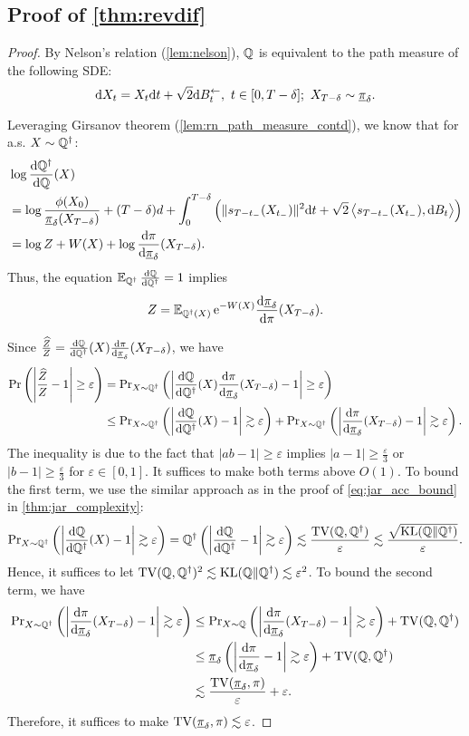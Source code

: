\subsection{Proof of \cref{thm:revdif}}
\label{app:prf:revdif}
\begin{proof}
By Nelson's relation (\cref{lem:nelson}), $\Q$ is equivalent to the path measure of the following SDE: 
$$\d X_t=X_t\d t+\sqrt{2}\d\Bl_t,~t\in[0,T-\delta];~X_{T-\delta}\sim\piu_\delta.$$

Leveraging Girsanov theorem (\cref{lem:rn_path_measure_contd}), we know that for a.s. $X\sim\Qd$:
\begin{align*}
    &\log\de{\Qd}{\Q}(X)\\
    &=\log\frac{\phi(X_0)}{\piu_\delta(X_{T-\delta})}+(T-\delta)d+\int_0^{T-\delta}\ro{\|s_{T-t_-}(X_{t_-})\|^2\d t+\sqrt{2}\inn{s_{T-t_-}(X_{t_-}),\d B_t}}\\
    &=\log Z+W(X)+\log\de{\pi}{\piu_\delta}(X_{T-\delta}).
\end{align*}
Thus, the equation $\E_{\Qd}\de{\Q}{\Qd}=1$ implies 
$$Z=\E_{\Qd(X)}\e^{-W(X)}\de{\piu_\delta}{\pi}(X_{T-\delta}).$$

Since $\frac{\Zh}{Z}=\de{\Q}{\Qd}(X)\de{\pi}{\piu_\delta}(X_{T-\delta})$, we have
\begin{align*}
    \prob\ro{\abs{\frac{\Zh}{Z}-1}\ge\varepsilon}&=\prob_{X\sim\Qd}\ro{\abs{\de{\Q}{\Qd}(X)\de{\pi}{\piu_\delta}(X_{T-\delta})-1}\ge\varepsilon}\\
    &\le\prob_{X\sim\Qd}\ro{\abs{\de{\Q}{\Qd}(X)-1}\gtrsim\varepsilon}+\prob_{X\sim\Qd}\ro{\abs{\de{\pi}{\piu_\delta}(X_{T-\delta})-1}\gtrsim\varepsilon}.
\end{align*}
The inequality is due to the fact that $|ab-1|\ge\varepsilon$ implies $|a-1|\ge\frac{\varepsilon}{3}$ or $|b-1|\ge\frac{\varepsilon}{3}$ for $\varepsilon\in[0,1]$. It suffices to make both terms above $O(1)$. To bound the first term, we use the similar approach as in the proof of \cref{eq:jar_acc_bound} in \cref{thm:jar_complexity}:
$$\prob_{X\sim\Qd}\ro{\abs{\de{\Q}{\Qd}(X)-1}\gtrsim\varepsilon}=\Qd\ro{\abs{\de{\Q}{\Qd}-1}\gtrsim\varepsilon}\lesssim\frac{\tv(\Q,\Qd)}{\varepsilon}\lesssim\frac{\sqrt{\kl(\Q\|\Qd)}}{\varepsilon}.$$
Hence, it suffices to let $\tv(\Q,\Qd)^2\lesssim\kl(\Q\|\Qd)\lesssim\varepsilon^2$. To bound the second term, we have
\begin{align*}
    \prob_{X\sim\Qd}\ro{\abs{\de{\pi}{\piu_\delta}(X_{T-\delta})-1}\gtrsim\varepsilon}&\le\prob_{X\sim\Q}\ro{\abs{\de{\pi}{\piu_\delta}(X_{T-\delta})-1}\gtrsim\varepsilon}+\tv(\Q,\Qd)\\
    &\le \piu_\delta\ro{\abs{\de{\pi}{\piu_\delta}-1}\gtrsim\varepsilon}+\tv(\Q,\Qd)\\
    &\lesssim\frac{\tv(\piu_\delta,\pi)}{\varepsilon}+\varepsilon.
\end{align*}
Therefore, it suffices to make $\tv(\piu_\delta,\pi)\lesssim\varepsilon$.
\end{proof}